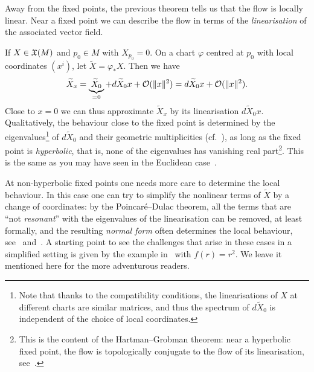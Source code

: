 \begin{remark}\label{rmk:linearisation}
	Away from the fixed points, the previous theorem tells us that the flow is locally linear.
	Near a fixed point we can describe the flow in terms of the \emph{linearisation} of the associated vector field.

	If $X\in\mathfrak{X}(M)$ and $p_0\in M$ with $X_{p_0} = 0$. On a chart $\varphi$ centred at $p_0$ with local coordinates $(x^i)$, let $\widetilde X = \varphi_* X$.
	Then we have
	\begin{equation}
		\widetilde X_x = \underbrace{\widetilde X_0}_{=0} + d\widetilde X_0 x + \mathcal{O}(\|x\|^2) = d\widetilde X_0 x + \mathcal{O}(\|x\|^2).
	\end{equation}
	Close to $x=0$ we can thus approximate $\widetilde X_x$ by its linearisation $ d\widetilde X_0 x$.
	Qualitatively, the behaviour close to the fixed point is determined by the eigenvalues\footnote{Note that thanks to the compatibility conditions, the linearisations of $X$ at different charts are similar matrices, and thus the spectrum of $d\widetilde X_0$ is independent of the choice of local coordinates.} of $d\widetilde X_0$ and their geometric multiplicities (cf.~\cite[Figure 9.8]{book:lee}), as long as the fixed point is \emph{hyperbolic}, that is, none of the eigenvalues has vanishing real part\footnote{This is the content of the Hartman--Grobman theorem: near a hyperbolic fixed point, the flow is topologically conjugate to the flow of its linearisation, see~\cite[Theorem 9.9]{book:teschl}.}. This is the same as you may have seen in the Euclidean case~\cite[Chapter 5.3]{book:knauf}.

	At non-hyperbolic fixed points one needs more care to determine the local behaviour.
	In this case one can try to simplify the nonlinear terms of $\widetilde X$ by a change of coordinates: by the Poincar\'e--Dulac theorem, all the terms that are ``not \emph{resonant}'' with the eigenvalues of the linearisation can be removed, at least formally, and the resulting \emph{normal form} often determines the local behaviour, see~\cite[\S 23]{book:arnold:ode} and~\cite[Section 3.3]{book:guckenheimerholmes}.
	A starting point to see the challenges that arise in these cases in a simplified setting is given by the example in~\cite[Section 7.3]{book:teschl} with $f(r)=r^2$. We leave it mentioned here for the more adventurous readers.
\end{remark}

